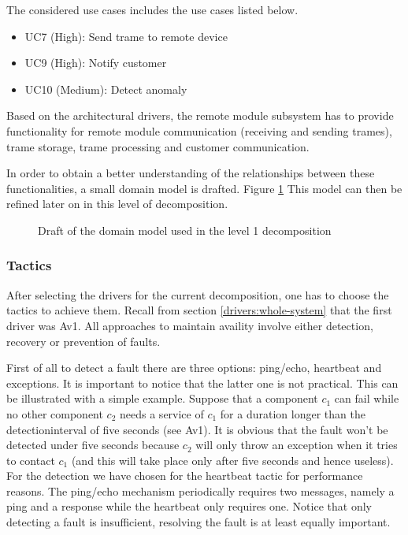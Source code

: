 \npar The considered use cases includes the use cases listed below. 

\begin{itemize}
	\item UC7 (High): Send trame to remote device
	\item UC9 (High): Notify customer
	\item UC10 (Medium): Detect anomaly
\end{itemize}

\npar Based on the architectural drivers, the remote module subsystem has to
provide functionality for remote module communication (receiving and sending
trames), trame storage, trame processing and customer communication. 

\npar In order to obtain a better understanding of the relationships between
these functionalities, a small domain model is drafted. Figure
\ref{fig:dec/whole-system/draft} This model can then be refined later on
in this level of decomposition.

\begin{figure}[H]
	\begin{centering}
		\caption{Draft of the domain model used in the level 1 decomposition}
		\label{fig:dec/whole-system/draft}
	\end{centering}
\end{figure}

\subsubsection{Tactics}
\label{tactics:whole-system}

\npar After selecting the drivers for the current decomposition, one has to
choose the tactics to achieve them. Recall from section
\ref{drivers:whole-system} that the first driver was Av1. All approaches to
maintain availity involve either detection, recovery or prevention of faults.

\npar First of all to detect a fault there are three options: ping/echo,
heartbeat and exceptions. It is important to notice that the latter one is not
practical. This can be illustrated with a simple example. Suppose that a
component $c_1$ can fail while no other component $c_2$ needs a service of
$c_1$ for a duration longer than the detectioninterval of five seconds (see
Av1). It is obvious that the fault won't be detected under five seconds
because $c_2$ will only throw an exception when it tries to contact $c_1$ (and
this will take place only after five seconds and hence useless). For the
detection we have chosen for the heartbeat tactic for performance reasons.
The ping/echo mechanism periodically requires two messages, namely a ping and a
response while the heartbeat only requires one. Notice that only detecting a
fault is insufficient, resolving the fault is at least equally important.

